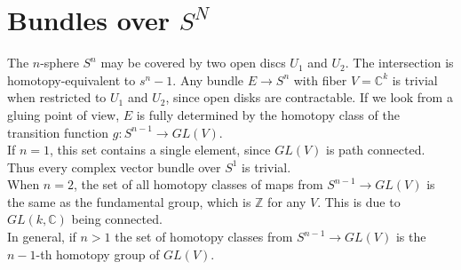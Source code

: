 \documentclass[../Thesis.tex]{subfiles}
\begin{document}
\section{Bundles over $S^N$}
The $n$-sphere $S^n$ may be covered by two open discs $U_1$ and $U_2$. The intersection is homotopy-equivalent to $s^n-1$. Any bundle $E \rightarrow S^n$ with fiber $V = \mathbb{C}^k$ is trivial when restricted to $U_1$ and $U_2$, since open disks are contractable. If we look from a gluing point of view, $E$ is fully determined by the homotopy class of the transition function $g : S^{n-1} \rightarrow GL(V)$.
\\If $n = 1$, this set contains a single element, since $GL(V)$ is path connected. Thus every complex vector bundle over $S^1$ is trivial.
\\When $n = 2$, the set of all homotopy classes of maps from $S^{n-1} \rightarrow GL(V)$ is the same as the fundamental group, which is $\mathbb{Z}$ for any $V$. This is due to $GL(k, \mathbb{C})$ being connected.
\\In general, if $n > 1$ the set of homotopy classes from $S^{n-1} \rightarrow GL(V)$ is the $n-1$-th homotopy group of $GL(V)$.
\end{document}
